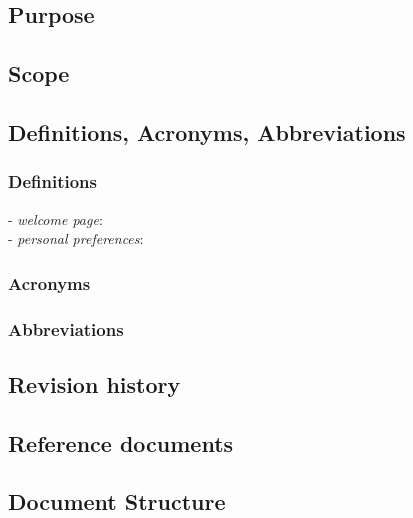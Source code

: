 \subsection{Purpose}
\subsection{Scope}
\subsection{Definitions, Acronyms, Abbreviations}
	\subsubsection{Definitions}
		\begin{description}
			\item[- \textit{welcome page}:] %
			\item[- \textit{personal preferences}:] %
		\end{description}
		
	\subsubsection{Acronyms}
	\subsubsection{Abbreviations}
\subsection{Revision history}
\subsection{Reference documents}
\subsection{Document Structure}